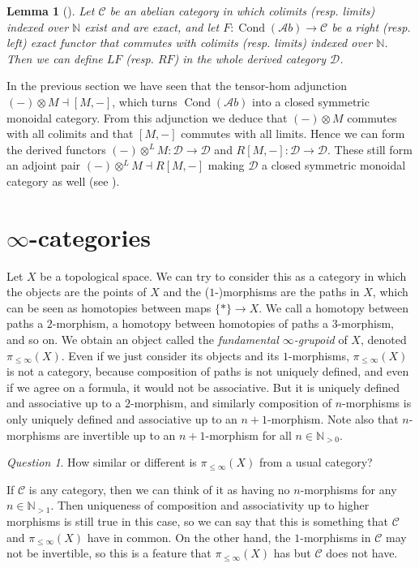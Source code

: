 \documentclass[11pt,A4]{article}
\theoremstyle{plain}
\newtheorem{lm}[thm]{Lemma}
\theoremstyle{definition}
\theoremstyle{remark}
\newtheorem{q}[thm]{Question}
\newcommand{\N}{\mathbb{N}}
\newcommand{\1}{\mathbbm{1}}
\newcommand{\C}{\mathscr{C}}
\newcommand{\Ab}{\mathscr{A}b}
\newcommand{\D}{\mathscr{D}}
\DeclareMathOperator{\Cond}{Cond}
\newcommand{\ot}{\otimes}
\begin{document}
\begin{lm}[{\cite[\href{https://stacks.math.columbia.edu/tag/0794}{Tag 0794}]{sta19}}]
    Let $\C$ be an abelian category in which colimits (resp. limits) indexed over $\N$ exist and are exact, and let $F\colon \Cond(\Ab)\to \C$ be a right (resp. left) exact functor that commutes with colimits (resp. limits) indexed over $\N$.
    Then we can define $LF$ (resp. $RF$) in the whole derived category $\D$.
\end{lm}

In the previous section we have seen that the tensor-hom adjunction $(-)\ot M\dashv [M,-]$, which turns $\Cond(\Ab)$ into a closed symmetric monoidal category.
From this adjunction we deduce that $(-)\ot M$ commutes with all colimits and that $[M,-]$ commutes with all limits.
Hence we can form the derived functors $(-)\ot^{L}M\colon \D\to \D$ and $R[M,-]\colon \D\to \D$.
These still form an adjoint pair $(-)\ot^{L}M\dashv R[M,-]$ making $\D$ a closed symmetric monoidal category as well (see \cite[\href{https://stacks.math.columbia.edu/tag/09T5}{Tag 09T5}]{sta19}).

\section{$\infty$-categories}

Let $X$ be a topological space.
We can try to consider this as a category in which the objects are the points of $X$ and the ($1$-)morphisms are the paths in $X$, which can be seen as homotopies between maps $\{ *\}\to X$.
We call a homotopy between paths a $2$-morphism, a homotopy between homotopies of paths a $3$-morphism, and so on.
We obtain an object called the \textit{fundamental $\infty$-grupoid} of $X$, denoted $\pi_{\leqslant \infty}(X)$.
Even if we just consider its objects and its $1$-morphisms, $\pi_{\leqslant \infty }(X)$ is not a category, because composition of paths is not uniquely defined, and even if we agree on a formula, it would not be associative.
But it is uniquely defined and associative up to a $2$-morphism, and similarly composition of $n$-morphisms is only uniquely defined and associative up to an $n+1$-morphism.
Note also that $n$-morphisms are invertible up to an $n+1$-morphism for all $n\in \N_{>0}$.

\begin{q}
    How similar or different is $\pi_{\leqslant \infty}(X)$ from a usual category?
\end{q}

If $\C$ is any category, then we can think of it as having no $n$-morphisms for any $n\in \N_{>1}$.
Then uniqueness of composition and associativity up to higher morphisms is still true in this case, so we can say that this is something that $\C$ and $\pi_{\leqslant \infty }(X)$ have in common.
On the other hand, the $1$-morphisms in $\C$ may not be invertible, so this is a feature that $\pi_{\leqslant \infty}(X)$ has but $\C$ does not have.
\end{document}
